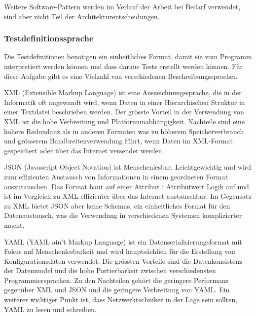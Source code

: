 \documentclass[]{subfiles}
\begin{document}
		Weitere Software-Pattern werden im Verlauf der Arbeit bei Bedarf verwendet, sind aber nicht Teil der Architekturentscheidungen.
		\newpage

		\subsubsection{Testdefinitionssprache}
		Die Testdefinitionen benötigen ein einheitliches Format, damit sie vom Programm interpretiert werden können und dass daraus Tests erstellt werden können.
		Für diese Aufgabe gibt es eine Vielzahl von verschiedenen Beschreibungssprachen.
		
		XML (Extensible Markup Language) ist eine Auszeichnungssprache, die in der Informatik oft angewandt wird, wenn Daten in einer Hierarchischen Struktur in einer Textdatei beschrieben werden.
		Der grösste Vorteil in der Verwendung von XML ist die hohe Verbreitung und Platformunabhängigkeit.
		Nachteile sind eine höhere Redundanz als in anderen Formaten was zu höherem Speicherverbrauch und grösserem Bandbreitenverwendung führt, wenn Daten im XML-Format gespeichert oder über das Internet versendet werden.

		JSON (Javascript Object Notation) ist Menschenlesbar, Leichtgewichtig und wird zum effizienten Austausch von Informationen in einem geordneten Format auszutauschen.
		Das Format baut auf einer Attribut : Attributwert Logik auf und ist im Vergleich zu XML effizienter über das Internet austauschbar.
		Im Gegensatz zu XML bietet JSON aber keine Schemas, ein einheitliches Format für den Datenaustausch, was die Verwendung in verschiedenen Systemen komplizierter macht.

		YAML (YAML ain't Markup Language) ist ein Datenserialisierungsformat mit Fokus auf Menschenlesbarkeit und wird hauptsächlich für die Erstellung von Konfigurationsdaten verwendet.
		Die grössten Vorteile sind die Datenkonsistenz der Datenmodel und die hohe Portierbarkeit zwischen verschiedensten Programmiersprachen.
		Zu den Nachteilen gehört die geringere Performanz gegenüber XML und JSON und die geringere Verbreitung von YAML.
		Ein weiterer wichtiger Punkt ist, dass Netzwerktechniker in der Lage sein sollten, YAML zu lesen und schreiben.
\end{document}
